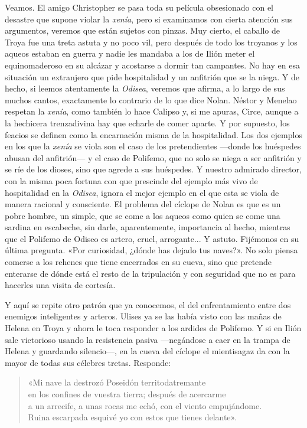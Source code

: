 \documentclass[11pt,a4paper]{article}
\begin{document}
Veamos. El amigo Christopher se pasa toda su película obsesionado con el desastre que supone violar la \emph{xenía}, pero si examinamos con cierta atención sus argumentos, veremos que están sujetos con pinzas. Muy cierto, el caballo de Troya fue una treta astuta y no poco vil, pero después de todo los troyanos y los aqueos estaban en guerra y nadie les mandaba a los de Ilión meter el equinomaderoso en su alcázar y acostarse a dormir tan campantes. No hay en esa situación un extranjero que pide hospitalidad y un anfitrión que se la niega. Y de hecho, si leemos atentamente la \emph{Odisea}, veremos que afirma,  a lo largo de sus muchos cantos, exactamente lo contrario de lo que dice Nolan. Néstor y Menelao respetan la \emph{xenía}, como también lo hace Calipso y, si me apuras, Circe, aunque a la hechicera trenzadivina hay que echarle de comer aparte. Y por supuesto, los feacios se definen como la encarnación misma de la hospitalidad. Los dos ejemplos en los que la \emph{xenía} se viola son el caso de los pretendientes ---donde los huéspedes abusan del anfitrión--- y el caso de Polifemo, que no solo se niega a ser anfitrión y se ríe de los dioses, sino que agrede a sus huéspedes. Y nuestro admirado director, con la misma poca fortuna con que prescinde del ejemplo más vivo de hospitalidad en la \emph{Odisea}, ignora el mejor ejemplo en el que esta se viola de manera racional y consciente. El problema del cíclope de Nolan es que es un pobre hombre, un simple, que se come a los aqueos como quien se come una sardina en escabeche, sin darle, aparentemente, importancia al hecho, mientras que el Polifemo de Odiseo es artero, cruel, arrogante... Y astuto. Fijémonos en su última pregunta. «Por curiosidad, ¿dónde has dejado tus naves?». No solo piensa comerse a los rehenes que tiene encerrados en su cueva, sino que pretende enterarse de dónde está el resto de la tripulación y con seguridad que no es para hacerles una visita de cortesía.

Y aquí se repite otro patrón que ya conocemos, el del enfrentamiento entre dos enemigos inteligentes y arteros. Ulises ya se las había visto con las mañas de Helena en Troya y ahora le toca responder a los ardides de Polifemo. Y si en Ilión sale victorioso usando la resistencia pasiva ---negándose a caer en la trampa de Helena y guardando silencio---, en la cueva del cíclope el mientisagaz da con la mayor de todas sus célebres tretas. Responde:

\begin{verse}
«Mi nave la destrozó Poseidón territodatremante\\
en los confines de vuestra tierra; después de acercarme\\
a un arrecife, a unas rocas me echó, con el viento empujándome.\\
Ruina escarpada esquivé yo con estos que tienes delante».
\end{verse}
\end{document}
